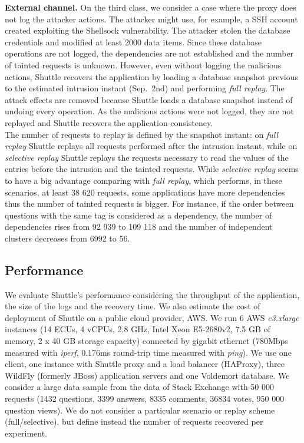\textbf{External channel.}
On the third class, we consider a case where the proxy does not log the attacker actions. The attacker might use, for example, a SSH account created exploiting the Shellsock vulnerability. The attacker stolen the database credentials and modified at least 2000 data items. Since these database operations are not logged, the dependencies are not established and the number of tainted requests is unknown. However, even without logging the malicious actions, Shuttle recovers the application by loading a database snapshot previous to the estimated intrusion instant (Sep.~2nd) and performing \textit{full replay}. The attack effects are removed because Shuttle loads a database snapshot instead of undoing every operation. As the malicious actions were not logged, they are not replayed and Shuttle recovers the application consistency.\\


The number of requests to replay is defined by the snapshot instant: on \textit{full replay} Shuttle replays all requests performed after the intrusion instant, while on \textit{selective replay} Shuttle replays the requests necessary to read the values of the entries before the intrusion and the tainted requests. While  \textit{selective replay} seems to have a big advantage comparing with  \textit{full replay}, which performs, in these scenarios, at least 38 620 requests, some applications have more dependencies thus the number of tainted requests is bigger. For instance, if the order between questions with the same tag is considered as a dependency,  the number of dependencies rises from 92 939 to 109 118 and the number of independent clusters decreases from 6992 to 56. %



\subsection{Performance}
\label{sec:evaluation:performance}

We evaluate Shuttle's performance considering the throughput of the application, the size of the logs and the recovery time. We also estimate the cost of deployment of Shuttle on a public cloud provider, \acf{AWS}. We run 6 \ac{AWS} \textit{c3.xlarge} instances (14 ECUs, 4 vCPUs, 2.8 GHz, Intel Xeon E5-2680v2, 7.5 GB of memory, 2 x 40 GB storage capacity) connected by gigabit ethernet (780Mbps measured with \emph{iperf}, 0.176ms round-trip time measured with \emph{ping}). We use one client, one instance with Shuttle proxy and a load balancer (HAProxy), three WildFly (formerly JBoss) application servers and one Voldemort database. We consider a large data sample from the data of Stack Exchange with 50 000 requests (1432 questions, 3399 answers, 8335 comments, 36834 votes, 950 000 question views). We do not consider a particular scenario or replay scheme (full/selective), but define instead the number of requests recovered per experiment.

